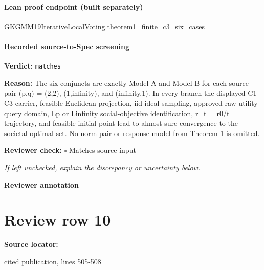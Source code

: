 \documentclass[10pt]{article}
\newcommand{\reviewerbox}{%
  \par\noindent\fbox{\parbox{0.96\linewidth}{\rule{0pt}{0.38in}}}\par
}
\newcommand{\reviewmatch}[1]{%
  \par\noindent\textbf{Reviewer check:} $\square$\; #1\par
  \noindent\emph{If left unchecked, explain the discrepancy or uncertainty below.}\par
}
\begin{document}
\paragraph{Lean proof endpoint (built separately)}\begin{ReviewVerbatim}
GKGMM19IterativeLocalVoting.theorem1_finite_c3_six_cases
\end{ReviewVerbatim}

\paragraph{Recorded source-to-Spec screening}
\textbf{Verdict:} \texttt{matches}
\\
{\raggedright
\textbf{Reason:} The six conjuncts are exactly Model A and Model B for each source pair (p,q) = (2,2), (1,infinity), and (infinity,1).\allowbreak{} In every branch the displayed C1-\allowbreak{}C3 carrier, feasible Euclidean projection, iid ideal sampling, approved raw utility-\allowbreak{}query domain, Lp or Linfinity social-\allowbreak{}objective identification, r\_\allowbreak{}t = r0/\allowbreak{}t trajectory, and feasible initial point lead to almost-\allowbreak{}sure convergence to the societal-\allowbreak{}optimal set.\allowbreak{} No norm pair or response model from Theorem 1 is omitted.\allowbreak{}
\par}
\reviewmatch{Matches source input}
\noindent\textbf{Reviewer annotation}\par
\reviewerbox
\clearpage
\hypertarget{source-claim-632778126c1e7202}{}
\section*{Review row 10}
\textbf{Source locator:} {\footnotesize\raggedright cited publication, lines 505-\allowbreak{}508\par}
\end{document}

